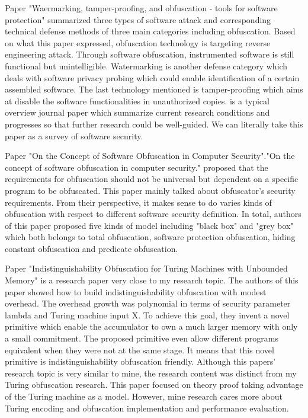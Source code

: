 \documentclass{sig-alternate-05-2015}
\begin{document}
Paper "Waermarking, tamper-proofing, and obfuscation - tools for software protection"\cite{Collberg:wartermarking} summarized three types of software attack and corresponding technical defense methods of three main categories including obfuscation. Based on what this paper expressed, obfuscation technology is targeting reverse engineering attack. Through software obfuscation, instrumented software is still functional but unintelligible.  Watermarking is another defense category which deals with software privacy probing which could enable identification of a certain assembled software. The last technology mentioned is tamper-proofing which aims at disable the software functionalities in unauthorized copies. \cite{Collberg:wartermarking} is a typical overview journal paper which summarize current research conditions and progresses so that further research could be well-guided. We can literally take this paper as a survey of software security. 

Paper "On the Concept of Software Obfuscation in Computer Security"."On the concept of software obfuscation in computer security."\cite{Kuzurin:Onthe}  proposed that the requirements for obfuscation should not be universal but dependent on a specific  program to be obfuscated. This paper mainly talked about obfuscator's security requirements. From their perspective, it makes sense to do varies kinds of obfuscation with respect to different software security definition. In total, authors of this paper proposed five kinds of model including "black box" and "grey box" which both belongs to total obfuscation, software protection obfuscation, hiding constant obfuscation and predicate obfuscation.

Paper "Indistinguishability Obfuscation for Turing Machines with Unbounded Memory"\cite{Koppula:Indistinguishability} is a research paper very close to my research topic. The authors of this paper showed how to build indistinguishability obfuscation with modest overhead. The overhead growth was polynomial in terms of security parameter lambda and Turing machine input X. To achieve this goal, they invent a novel primitive which enable the accumulator to own a much larger memory with only a small commitment. The proposed primitive even allow different programs equivalent when they were not at the same stage. It means that this novel primitive is indistinguishability obfuscation friendly. Although this papers' research topic is very similar to mine, the research content was distinct from my Turing obfuscation research. This paper focused on theory proof taking advantage of the Turing machine as a model. However, mine research cares more about Turing encoding and obfuscation implementation and performance evaluation.
\end{document}
